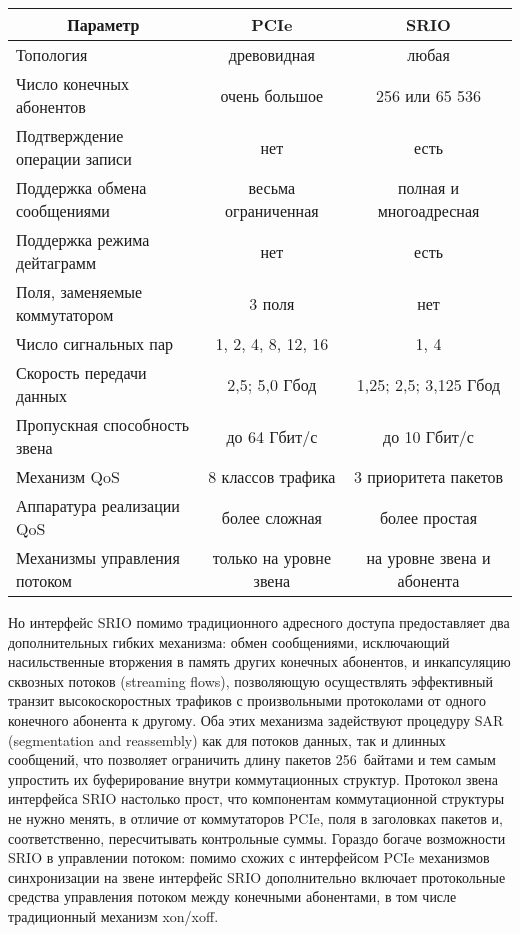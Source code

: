 \begin{multicols}{2}
\begin{table*}
\begin{center}
\begin{tabular}{|l|c|c|}
\hline
\multicolumn{1}{|c|}{Параметр}&PCIe&SRIO\\
\hline
Топология&древовидная&любая\\
Число конечных абонентов&очень большое&256 или 65 536\\
Подтверждение операции записи&нет&есть\\
Поддержка обмена сообщениями&весьма ограниченная&полная и многоадресная\\
Поддержка режима дейтаграмм&нет&есть\\
Поля, заменяемые коммутатором &3 поля&нет\\
Число сигнальных пар&1, 2, 4, 8, 12, 16&1, 4\\
Скорость передачи данных&2,5; 5,0 Гбод&1,25; 2,5; 3,125 Гбод\\
Пропускная способность звена&до 64 Гбит/с&до 10 Гбит/с\\
Механизм QoS&8 классов трафика&3 приоритета пакетов\\
Аппаратура реализации QoS&более сложная&более простая\\
Механизмы управления потоком&только на уровне звена&на уровне звена и абонента\\
\hline
\end{tabular}
\end{center}
\end{table*}
Но интерфейс SRIO помимо традиционного 
адресного доступа предоставляет два дополнительных гибких механизма: обмен 
сообщениями, исключающий насильственные вторжения в память других конечных 
абонентов, и инкапсуляцию сквозных потоков (streaming flows), позволяющую осуществлять 
эффективный транзит высокоскоростных трафиков с произвольными протоколами от одного 
конечного абонента к другому. Оба этих механизма задействуют процедуру SAR 
(segmentation and reassembly) как для потоков данных, так и длинных сообщений, что 
позволяет ограничить длину пакетов 256~байтами и тем самым упростить их буферирование 
внутри коммутационных структур. Протокол звена интерфейса SRIO настолько прост, что 
компонентам коммутационной структуры не нужно менять, в отличие от коммутаторов 
PCIe, поля в заголовках пакетов и, соответственно, пересчитывать контрольные суммы. 
Гораздо богаче возможности SRIO в управ\-ле\-нии потоком: помимо схожих с интерфейсом 
PCIe механизмов синхронизации на звене интерфейс SRIO дополнительно включает 
протокольные средства управления потоком между конечными абонентами, в том числе 
традиционный механизм xon/xoff.


\end{multicols}
